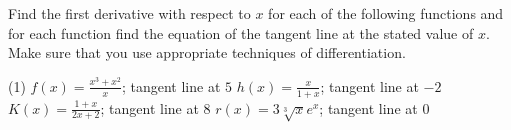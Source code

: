\documentclass[12pt,]{book}
\theoremstyle{plain}
\theoremstyle{definition}
\numberwithin{equation}{section}
\newcommand{\fe}[2]{#1\mathopen{}\left(#2\right)\mathclose{}}
\begin{document}
\par\smallskip\noindent
Find the first derivative with respect to \(x\) for each of the following functions and for each function find the equation of the tangent line at the stated value of \(x\).  Make sure that you use appropriate techniques of differentiation.%
\par
\begin{exercisegroup}(1)
\exercise[21.]\hypertarget{exercise-421}{\null}\(\fe{f}{x}=\frac{x^3+x^2}{x}\); tangent line at \(5\)%
\exercise[22.]\hypertarget{exercise-422}{\null}\(\fe{h}{x}=\frac{x}{1+x}\); tangent line at \(-2\)%
\exercise[23.]\hypertarget{exercise-423}{\null}\(\fe{K}{x}=\frac{1+x}{2x+2}\); tangent line at \(8\)%
\exercise[24.]\hypertarget{exercise-424}{\null}\(\fe{r}{x}=3\sqrt[3]{x}e^x\); tangent line at \(0\)%
\end{exercisegroup}
\par\smallskip\noindent
\end{document}
